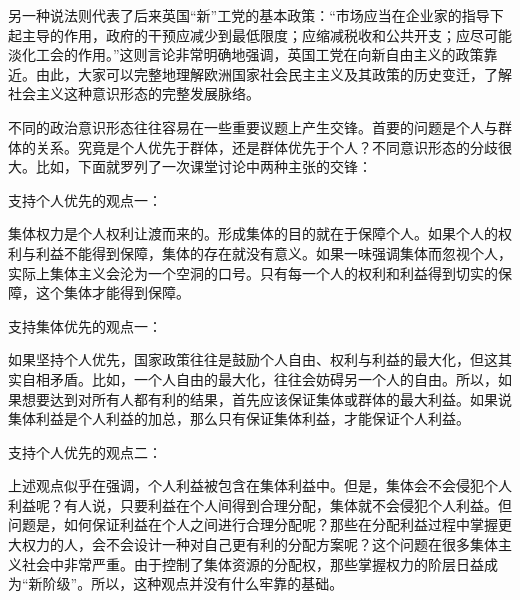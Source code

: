 
另一种说法则代表了后来英国“新”工党的基本政策：“市场应当在企业家的指导下起主导的作用，政府的干预应减少到最低限度；应缩减税收和公共开支；应尽可能淡化工会的作用。”这则言论非常明确地强调，英国工党在向新自由主义的政策靠近。由此，大家可以完整地理解欧洲国家社会民主主义及其政策的历史变迁，了解社会主义这种意识形态的完整发展脉络。


不同的政治意识形态往往容易在一些重要议题上产生交锋。首要的问题是个人与群体的关系。究竟是个人优先于群体，还是群体优先于个人？不同意识形态的分歧很大。比如，下面就罗列了一次课堂讨论中两种主张的交锋：

支持个人优先的观点一：

集体权力是个人权利让渡而来的。形成集体的目的就在于保障个人。如果个人的权利与利益不能得到保障，集体的存在就没有意义。如果一味强调集体而忽视个人，实际上集体主义会沦为一个空洞的口号。只有每一个人的权利和利益得到切实的保障，这个集体才能得到保障。

支持集体优先的观点一：

如果坚持个人优先，国家政策往往是鼓励个人自由、权利与利益的最大化，但这其实自相矛盾。比如，一个人自由的最大化，往往会妨碍另一个人的自由。所以，如果想要达到对所有人都有利的结果，首先应该保证集体或群体的最大利益。如果说集体利益是个人利益的加总，那么只有保证集体利益，才能保证个人利益。

支持个人优先的观点二：

上述观点似乎在强调，个人利益被包含在集体利益中。但是，集体会不会侵犯个人利益呢？有人说，只要利益在个人间得到合理分配，集体就不会侵犯个人利益。但问题是，如何保证利益在个人之间进行合理分配呢？那些在分配利益过程中掌握更大权力的人，会不会设计一种对自己更有利的分配方案呢？这个问题在很多集体主义社会中非常严重。由于控制了集体资源的分配权，那些掌握权力的阶层日益成为“新阶级”。所以，这种观点并没有什么牢靠的基础。

